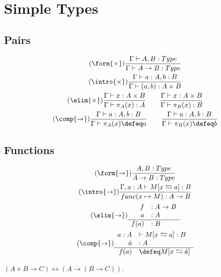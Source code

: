 \section{Simple Types}

\subsection{Pairs}
\begin{gather}
    \tag{$\form{\times}$}
    \frac{\Gamma\vdash A,B:Type}{\Gamma\vdash A\to B:Type}\\
    \tag{$\intro{\times}$}
    \frac{
        \Gamma\vdash a:A, b:B
    }{
        \Gamma \vdash (a,b):A\times B
    }\\
    \tag{$\elim{\times}$}
    \frac{
        \Gamma\vdash x:A\times B
    }{
        \Gamma \vdash \pi_A(x):A
    }
    \qquad
    \frac{
        \Gamma\vdash x:A\times B
    }{
        \Gamma \vdash \pi_B(x):B
    }\\
    \tag{$\comp{\to}$}
    \frac{
        \Gamma\vdash a:A, b:B
    }{
        \Gamma \vdash \pi_A(x)\defeq a
    }
    \qquad
    \frac{
        \Gamma\vdash a:A, b:B
    }{
        \Gamma \vdash \pi_B(x)\defeq b
    }
\end{gather}

\subsection{Functions}
\begin{gather}
    \tag{$\form{\to}$}
    \frac{A,B:Type}{A\to B:Type}\\
    \tag{$\intro{\to}$}
    \frac{
        \Gamma, a:A \vdash M[x\leftrightarrows a]:B
    }{
        func(x\mapsto M):A\to B
    }\\
    \tag{$\elim{\to}$}
    \begin{array}{rl}
        f&:A\to B\\
        a&:A\\
    \hline
        f(a)&:B
    \end{array}\\
    \tag{$\comp{\to}$}
    \begin{array}{rl}
        a:A&\vdash M[x\leftrightarrows a]:B\\
        \acute{a}&:A\\
    \hline
        f(a)&\defeq M[x\leftrightarrows \acute{a}]
    \end{array}
\end{gather}


\begin{theorem}
    $(A\times B\to C)\longleftrightarrow (A\to (B\to C))$.
\end{theorem}
